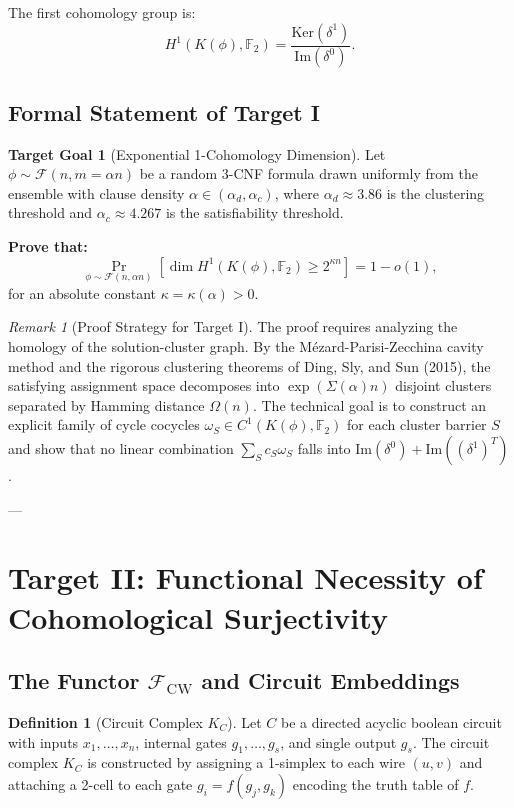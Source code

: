 \documentclass[11pt,a4paper]{article}
\theoremstyle{plain}
\theoremstyle{definition}
\newtheorem{definition}[theorem]{Definition}
\newtheorem{target}{Target Goal}[section]
\theoremstyle{remark}
\newtheorem{remark}[theorem]{Remark}
\newcommand{\Img}{\mathrm{Im}}
\newcommand{\Ker}{\mathrm{Ker}}
\begin{document}
The first cohomology group is:
\[
H^1(K(\phi), \mathbb{F}_2) = \frac{\Ker(\delta^1)}{\Img(\delta^0)}.
\]

\subsection{Formal Statement of Target I}

\begin{target}[Exponential 1-Cohomology Dimension]\label{target:1}
Let $\phi \sim \mathcal{F}(n, m = \alpha n)$ be a random 3-CNF formula drawn uniformly from the ensemble with clause density $\alpha \in (\alpha_d, \alpha_c)$, where $\alpha_d \approx 3.86$ is the clustering threshold and $\alpha_c \approx 4.267$ is the satisfiability threshold.

\textbf{Prove that:}
\[
\Pr_{\phi \sim \mathcal{F}(n, \alpha n)}\left[ \dim H^1(K(\phi), \mathbb{F}_2) \ge 2^{\kappa n} \right] = 1 - o(1),
\]
for an absolute constant $\kappa = \kappa(\alpha) > 0$.
\end{target}

\begin{remark}[Proof Strategy for Target I]
The proof requires analyzing the homology of the solution-cluster graph. By the Mézard-Parisi-Zecchina cavity method and the rigorous clustering theorems of Ding, Sly, and Sun (2015), the satisfying assignment space decomposes into $\exp(\Sigma(\alpha) n)$ disjoint clusters separated by Hamming distance $\Omega(n)$. The technical goal is to construct an explicit family of cycle cocycles $\omega_S \in C^1(K(\phi), \mathbb{F}_2)$ for each cluster barrier $S$ and show that no linear combination $\sum_{S} c_S \omega_S$ falls into $\Img(\delta^0) + \Img((\delta^1)^T)$.
\end{remark}

---

\section{Target II: Functional Necessity of Cohomological Surjectivity}

\subsection{The Functor $\mathcal{F}_{\mathrm{CW}}$ and Circuit Embeddings}

\begin{definition}[Circuit Complex $K_C$]
Let $C$ be a directed acyclic boolean circuit with inputs $x_1, \dots, x_n$, internal gates $g_1, \dots, g_s$, and single output $g_s$. The circuit complex $K_C$ is constructed by assigning a 1-simplex to each wire $(u, v)$ and attaching a 2-cell to each gate $g_i = f(g_j, g_k)$ encoding the truth table of $f$.
\end{definition}
\end{document}
